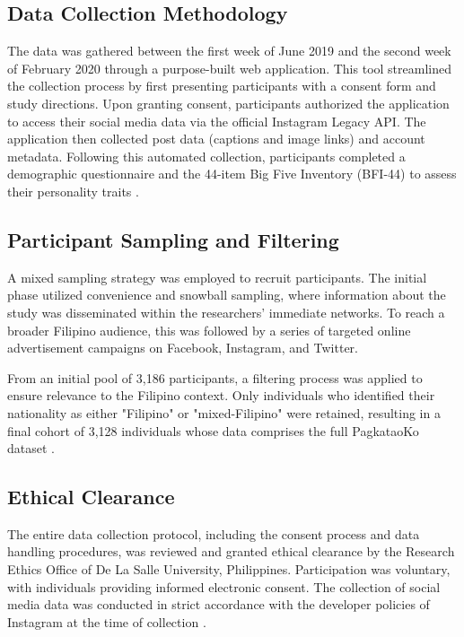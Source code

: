 \subsection{Data Collection Methodology}
The data was gathered between the first week of June 2019 and the second week of February 2020 through a purpose-built web application. This tool streamlined the collection process by first presenting participants with a consent form and study directions. Upon granting consent, participants authorized the application to access their social media data via the official Instagram Legacy API. The application then collected post data (captions and image links) and account metadata. Following this automated collection, participants completed a demographic questionnaire and the 44-item Big Five Inventory (BFI-44) to assess their personality traits \citep{tighe_acorda_2022}.

\subsection{Participant Sampling and Filtering}
A mixed sampling strategy was employed to recruit participants. The initial phase utilized convenience and snowball sampling, where information about the study was disseminated within the researchers' immediate networks. To reach a broader Filipino audience, this was followed by a series of targeted online advertisement campaigns on Facebook, Instagram, and Twitter.

From an initial pool of 3,186 participants, a filtering process was applied to ensure relevance to the Filipino context. Only individuals who identified their nationality as either "Filipino" or "mixed-Filipino" were retained, resulting in a final cohort of 3,128 individuals whose data comprises the full PagkataoKo dataset \citep{tighe_acorda_2022}.

\subsection{Ethical Clearance}
The entire data collection protocol, including the consent process and data handling procedures, was reviewed and granted ethical clearance by the Research Ethics Office of De La Salle University, Philippines. Participation was voluntary, with individuals providing informed electronic consent. The collection of social media data was conducted in strict accordance with the developer policies of Instagram at the time of collection \citep{tighe_acorda_2022}.

